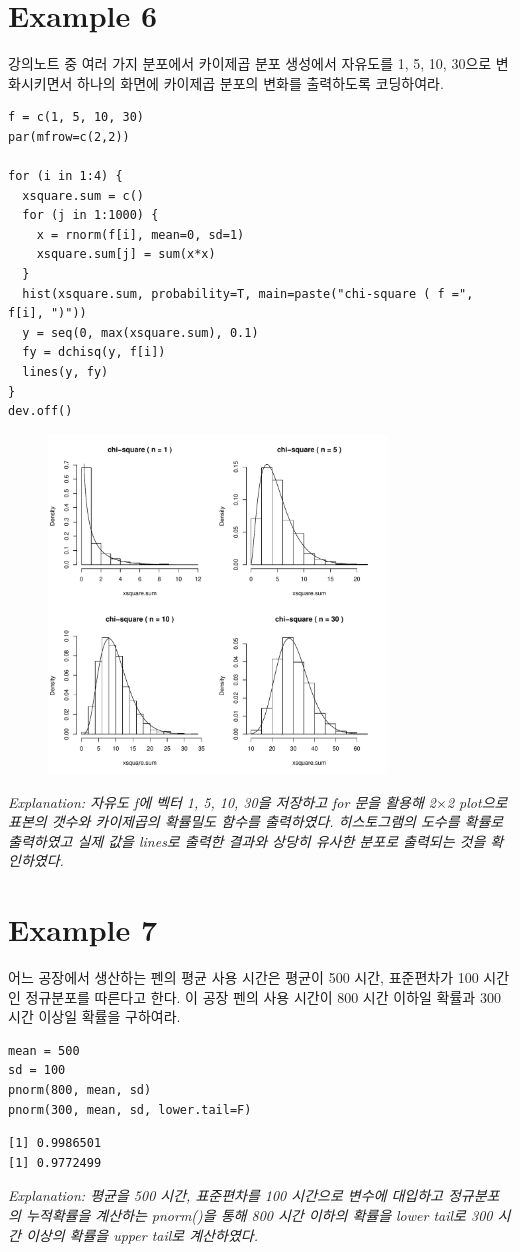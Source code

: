 \documentclass{article}
\begin{document}
\section*{Example 6}
강의노트 중 여러 가지 분포에서 카이제곱 분포 생성에서 자유도를 1, 5, 10, 30으로 변화시키면서 하나의 화면에 카이제곱 분포의 변화를 출력하도록 코딩하여라.
\begin{lstlisting}[style={r-style}]
f = c(1, 5, 10, 30)
par(mfrow=c(2,2))

for (i in 1:4) {
  xsquare.sum = c()
  for (j in 1:1000) {
    x = rnorm(f[i], mean=0, sd=1)
    xsquare.sum[j] = sum(x*x)
  }
  hist(xsquare.sum, probability=T, main=paste("chi-square ( f =", f[i], ")"))
  y = seq(0, max(xsquare.sum), 0.1)
  fy = dchisq(y, f[i])
  lines(y, fy)
}
dev.off()
\end{lstlisting}
\begin{figure}[htb!]
    \centering
    \includegraphics[width=0.8\textwidth]{fig/ex6.pdf}
\end{figure}
\emph{Explanation: 자유도 f에 벡터 1, 5, 10, 30을 저장하고 for 문을 활용해 2$\times$2 plot으로 표본의 갯수와 카이제곱의 확률밀도 함수를 출력하였다. 히스토그램의 도수를 확률로 출력하였고 실제 값을 lines로 출력한 결과와 상당히 유사한 분포로 출력되는 것을 확인하였다. } \\

\section*{Example 7}
어느 공장에서 생산하는 펜의 평균 사용 시간은 평균이 500 시간, 표준편차가 100 시간인 정규분포를 따른다고 한다. 이 공장 펜의 사용 시간이 800 시간 이하일 확률과 300 시간 이상일 확률을 구하여라. 
\begin{lstlisting}[style={r-style}]
mean = 500
sd = 100
pnorm(800, mean, sd)
pnorm(300, mean, sd, lower.tail=F)
\end{lstlisting}
\begin{lstlisting}[style={out-style}]
[1] 0.9986501
[1] 0.9772499
\end{lstlisting}
\emph{Explanation: 평균을 500 시간, 표준편차를 100 시간으로 변수에 대입하고 정규분포의 누적확률을 계산하는 pnorm()을 통해 800 시간 이하의 확률을 lower tail로 300 시간 이상의 확률을 upper tail로 계산하였다. } \\
\end{document}
